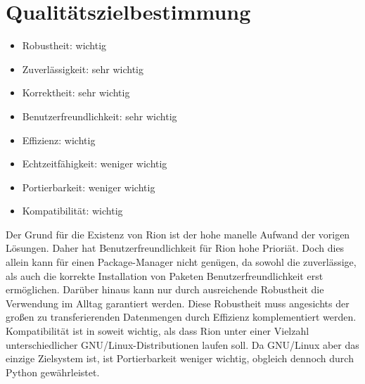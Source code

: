 \chapter{Qualitätszielbestimmung}

\begin{itemize}
	\item Robustheit: wichtig
	\item Zuverlässigkeit: sehr wichtig
	\item Korrektheit: sehr wichtig
	\item Benutzerfreundlichkeit: sehr wichtig
	\item Effizienz: wichtig
	\item Echtzeitfähigkeit: weniger wichtig
	\item Portierbarkeit: weniger wichtig
	\item Kompatibilität: wichtig
\end{itemize}

Der Grund für die Existenz von Rion ist der hohe manelle Aufwand der vorigen Lösungen.
Daher hat Benutzerfreundlichkeit für Rion hohe Prioriät.
Doch dies allein kann für einen Package-Manager nicht genügen, da sowohl die zuverlässige, als auch die korrekte Installation von Paketen Benutzerfreundlichkeit erst ermöglichen. Darüber hinaus kann nur durch ausreichende Robustheit die Verwendung im Alltag garantiert werden. Diese Robustheit muss angesichts der großen zu transferierenden Datenmengen durch Effizienz komplementiert werden.
Kompatibilität ist in soweit wichtig, als dass Rion unter einer Vielzahl unterschiedlicher GNU/Linux-Distributionen laufen soll. Da GNU/Linux aber das einzige Zielsystem ist, ist Portierbarkeit weniger wichtig, obgleich dennoch durch Python gewährleistet.
 